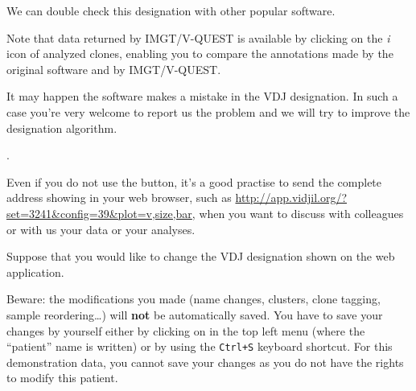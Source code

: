 \documentclass[10pt]{article}
\begin{document}

We can double check this designation with other popular software.
  
Note that data returned by IMGT/V-QUEST is available by clicking on the \textit{i} icon of analyzed clones,
enabling you to compare the annotations made by the original software and by IMGT/V-QUEST. 


\bigskip

It may happen the software makes a mistake in the VDJ designation.
In such a case you're very welcome to report us the problem
and we will try to improve the designation algorithm.

.

Even if you do not use the  button, it's a good practise
to send the complete address showing in your web browser, such
as  \url{http://app.vidjil.org/?set=3241&config=39&plot=v,size,bar},
when you want to discuss with colleagues or with us your data or your analyses.

\bigskip

Suppose that you would like to change the VDJ designation shown on the web application.

Beware: the modifications you made (name changes, clusters, clone
tagging, sample reordering\dots) will \textbf{not} be automatically saved. You have to save
your changes by yourself either by clicking on  in the top left menu (where the
``patient'' name is written) or by using the \texttt{Ctrl+S} keyboard
shortcut.
For this demonstration data, you cannot save your changes as you do not have
the rights to modify this patient.
\end{document}
